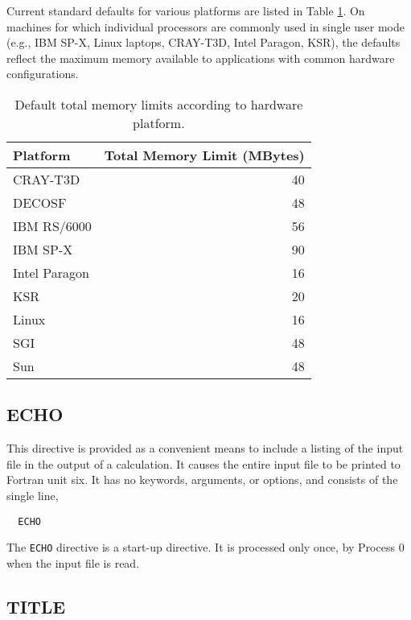 Current standard defaults for various platforms are listed in Table
\ref{tbl:default-memory-limits}.  On machines for which individual
processors are commonly used in single user mode (e.g., IBM SP-X,
Linux laptops, CRAY-T3D, Intel Paragon, KSR), the defaults reflect
the maximum memory available to applications with common hardware
configurations.

\begin{table}
\caption{Default total memory limits according to hardware platform.}
\label{tbl:default-memory-limits}
\begin{tabular}{lr}
\hline\hline
Platform        & Total Memory Limit (MBytes) \\
\hline
CRAY-T3D        & 40 \\
DECOSF          & 48 \\
IBM RS/6000     & 56 \\
IBM SP-X        & 90 \\
Intel Paragon   & 16 \\
KSR             & 20 \\
Linux           & 16 \\
SGI             & 48 \\
Sun             & 48 \\
\hline\hline
\end{tabular}
\end{table}

\subsection{ECHO}
\label{sec:echo}

This directive is provided as a convenient means to include a listing of
the input file in the output of a calculation.  It causes the entire input 
file to be printed to Fortran unit six.  It has no keywords, arguments, or
options, and consists of the single line,

\begin{verbatim}
  ECHO
\end{verbatim}

The \verb+ECHO+ directive is a start-up directive.  It is processed only
once, by Process 0 when the input file is read.

\subsection{TITLE}


